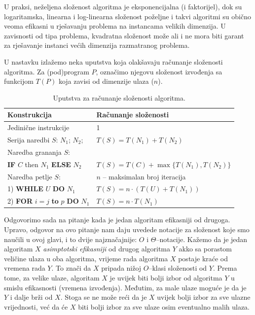 U praksi, neželjena složenost algoritma je eksponencijalna (i faktorijel), dok su logaritamska, linearna i log-linearna složenost poželjne i takvi algori\-tmi su obično veoma efikasni u rješavanju problema na instancama velikih dimenzija. U zavisnosti od tipa problema, kvadratna složenost može ali i ne mora biti garant za rješavanje instanci većih dimenzija razmatranog  problema. %


U nastavku izlažemo neka uputstva koja olakšavaju računanje složenosti algoritma. Za (pod)program $P$, označimo njegovu složenost izvođenja sa funkcijom $T(P)$ koja   zavisi od dimenzije ulaza ($n$). 
 
\begin{table}[H]
		\caption{Uputstva za računanje složenosti algoritma.}  \label{tab:uputstva_racunanje}
	\centering
	\begin{tabular}{l |l} \hline 
		\textbf{Konstrukcija}         & \textbf{Računanje složenosti} \\ \hline
		Jedinične instrukcije         & 1 \\
        Serija naredbi $S$: $N_1$; $N_2$; &  $T(S) = T(N_1) + T(N_2)$  \\ \hline
        Naredba grananja $S$:           &                                \\
        \textbf{IF}  $C$ then $N_1$ \textbf{ELSE} $N_2$  & $T(S) = T(C) + \max\{ T(N_1), T(N_2)\}$  \\          \hline                 
         Naredba petlje $S$:            &   $n$ -- maksimalan broj iteracija          \\
         1) \textbf{WHILE} $U$ \textbf{DO} $N_1$                 &     $T(S)= n \cdot (T(U) + T(N_1))$         \\ 
         2) \textbf{FOR} $i=j$ \textbf{to} $p$ \textbf{DO} $N_1$  &    $T(S)= n\cdot T(N_1)$     \\  \hline
         
	\end{tabular}
\end{table}

Odgovorimo sada na pitanje kada je jedan algoritam efikasniji od drugoga. \\ 

Upravo, odgovor na ovo pitanje nam daju uvedede notacije za složenost koje smo naučili u ovoj glavi, i to dvije najznačajnije: $O$ i $\Theta$--notacije. Kažemo da je jedan algoritam $X$ \textit{asimptotski efikasniji} od drugog algoritma  $Y$ akko sa porastom veličine ulaza u oba algoritma, vrijeme rada algoritma $X$ postaje kraće od vremena rada $Y$. To znači da $X$ pripada nižoj $O$--klasi složenosti od $Y$. %
Prema tome, za velike ulaze, algoritam $X$ je uvijek biti bolji izbor od  algoritma $Y$ u smislu efikasnosti (vremena izvođenja). Međutim, za male ulaze moguće je da je $Y$ i dalje brži od $X$. Stoga se ne može reći da je $X$ uvijek bolji izbor za sve ulazne vrijednosti, već da će $X$ biti bolji izbor za sve ulaze osim eventualno malih ulaza.


